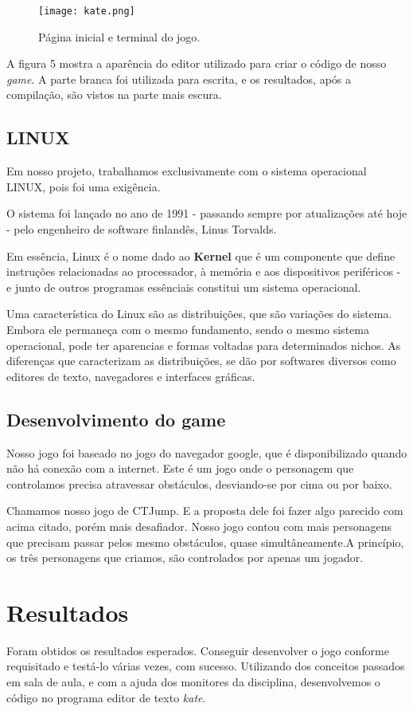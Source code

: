 \documentclass[journal]{IEEEtran}
\begin{document}
\begin{figure}[!htbp]
\centering
\texttt{[image: kate.png]}
\caption{Página inicial e terminal do jogo.}
\label{fig:fig_exemple}
\end{figure}

A figura 5 mostra a aparência do editor utilizado para criar o código de nosso \textit{game}. A parte branca foi utilizada para escrita, e os resultados, após a compilação, são vistos na parte mais escura.


\subsection{LINUX}
Em nosso projeto, trabalhamos exclusivamente com o sistema operacional LINUX, pois foi uma exigência.

O sistema foi lançado no ano de 1991 - passando sempre por atualizações até hoje - pelo engenheiro de software finlandês, Linus Torvalds. 

Em essência, Linux é o nome dado ao \textbf{Kernel} que é um componente  que define instruções relacionadas ao processador, à memória e aos dispositivos periféricos - e junto de outros programas essênciais constitui um sistema operacional.

Uma característica do Linux são as distribuições, que são variações do sistema. Embora ele permaneça com o mesmo fundamento, sendo o mesmo sistema operacional, pode ter aparencias e formas voltadas para determinados nichos. As diferenças que caracterizam as distribuições, se dão por softwares diversos como editores de texto, navegadores e interfaces gráficas.

\subsection{Desenvolvimento do game}
Nosso jogo foi baseado no jogo do navegador google, que é disponibilizado quando não há conexão com a internet. Este é um jogo onde o personagem que controlamos precisa atravessar obstáculos, desviando-se por cima ou por baixo.

Chamamos nosso jogo de CTJump. E a proposta dele foi fazer algo parecido com acima citado, porém mais desafiador. Nosso jogo contou com mais personagens que precisam passar pelos mesmo obstáculos, quase simultâneamente.A princípio, os três personagens que criamos, são controlados por apenas um jogador.

\section{Resultados}
Foram obtidos os resultados esperados. Conseguir desenvolver o jogo conforme requisitado e testá-lo várias vezes, com sucesso.
Utilizando dos conceitos passados em sala de aula, e com a ajuda dos monitores da disciplina, desenvolvemos o código no programa editor de texto \textit{kate}.
\end{document}
